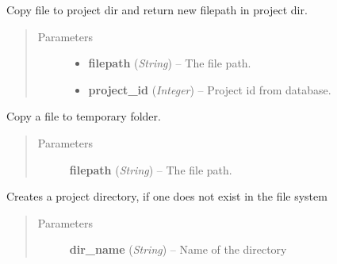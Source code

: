 \documentclass[letterpaper,10pt,english]{sphinxmanual}
\begin{document}
\begin{fulllineitems}
\label{filesystem:filesystem.CopyFileToProject}
Copy file to project dir and return new filepath in project dir.
\begin{quote}\begin{description}
\item[{Parameters}] \leavevmode\begin{itemize}
\item {} 
\textbf{filepath} (\emph{String}) -- The file path.

\item {} 
\textbf{project\_id} (\emph{Integer}) -- Project id from database.

\end{itemize}

\end{description}\end{quote}

\end{fulllineitems}


\begin{fulllineitems}
\label{filesystem:filesystem.CopyToTemp}
Copy a file to temporary folder.
\begin{quote}\begin{description}
\item[{Parameters}] \leavevmode
\textbf{filepath} (\emph{String}) -- The file path.

\end{description}\end{quote}

\end{fulllineitems}


\begin{fulllineitems}
\label{filesystem:filesystem.CreateProjectDir}
Creates a project directory, if one does not exist in the file system
\begin{quote}\begin{description}
\item[{Parameters}] \leavevmode
\textbf{dir\_name} (\emph{String}) -- Name of the directory

\end{description}\end{quote}

\end{fulllineitems}
\end{document}
